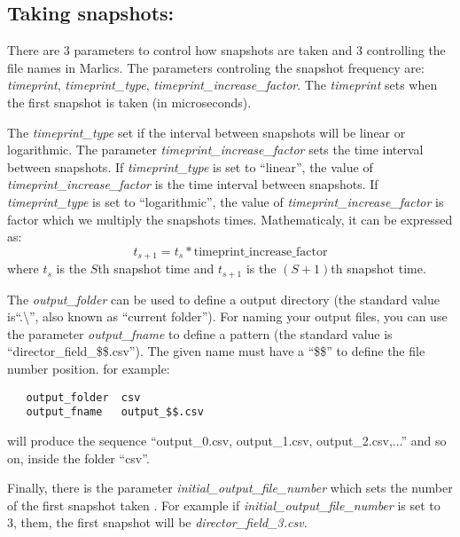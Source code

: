 \documentclass{article}
\begin{document}
\subsection{Taking snapshots:}


There are 3 parameters to control how snapshots are taken and 3 controlling the file names in Marlics. The parameters controling the snapshot frequency are: \textit{timeprint}, \textit{timeprint_type}, \textit{timeprint_increase_factor}. The \textit{timeprint} sets when the first snapshot is taken (in microseconds). 

The \textit{timeprint_type} 
{set if the interval between snapshots will be linear or logarithmic.
The parameter \textit{timeprint_increase_factor} sets the time interval between snapshots.
If \textit{timeprint_type} is set to ``linear'', the value of \textit{timeprint_increase_factor} is the time interval between snapshots. If \textit{timeprint_type} is set to ``logarithmic'', the value of \textit{timeprint_increase_factor} is factor which we multiply the snapshots times. Mathematicaly, it can be expressed as:}
\begin{equation}
  t_{s+1}=t_s *\textrm{timeprint_increase_factor}
\end{equation}
where $t_s$ is the $S$th snapshot time and $t_{s+1}$ is the $(S+1)$th snapshot time.

The \textit{output\_folder} can be used to define a output directory (the standard value is``.\textbackslash'', also known as ``current folder'').
For naming your output files, you can use the parameter \textit{output\_fname} to define a pattern (the standard value is ``director\_field\_\$\$.csv'').
The given name must have a ``\$\$'' to define the file number position.
for example:
\begin{lstlisting}
   output_folder  csv
   output_fname   output_$$.csv
\end{lstlisting}
will produce the sequence ``output\_0.csv, output\_1.csv, output\_2.csv,...'' and so on, inside the folder ``csv''.  

Finally, there is the parameter \textit{initial_output_file_number} which sets the number of the first snapshot taken . For example if \textit{initial_output_file_number} is set to 3, them, the first snapshot will be \textit{director_field_3.csv}.
\end{document}
